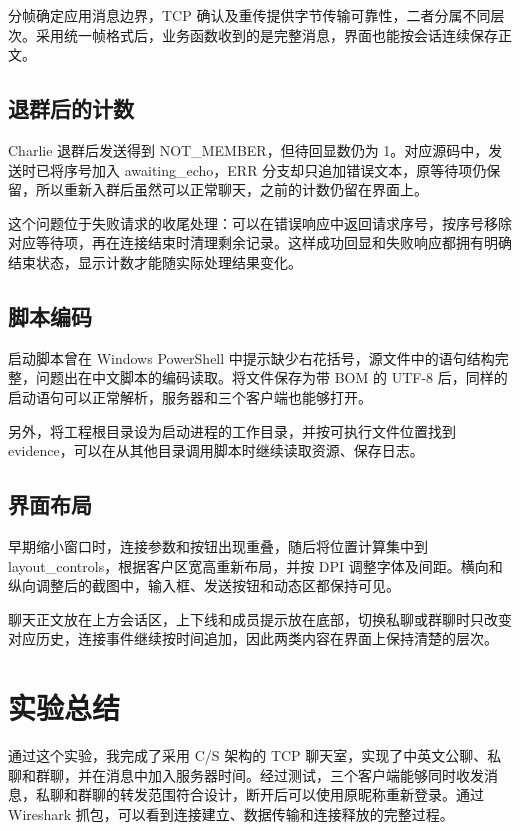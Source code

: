 \documentclass[UTF8,a4paper,10pt,fontset=fandol]{ctexart}
\begin{document}
分帧确定应用消息边界，TCP 确认及重传提供字节传输可靠性，二者分属不同层次。采用统一帧格式后，业务函数收到的是完整消息，界面也能按会话连续保存正文。

\subsection{退群后的计数}
Charlie 退群后发送得到 NOT\_MEMBER，但待回显数仍为 1。对应源码中，发送时已将序号加入 awaiting\_echo，ERR 分支却只追加错误文本，原等待项仍保留，所以重新入群后虽然可以正常聊天，之前的计数仍留在界面上。

这个问题位于失败请求的收尾处理：可以在错误响应中返回请求序号，按序号移除对应等待项，再在连接结束时清理剩余记录。这样成功回显和失败响应都拥有明确结束状态，显示计数才能随实际处理结果变化。

\medskip
\subsection{脚本编码}
启动脚本曾在 Windows PowerShell 中提示缺少右花括号，源文件中的语句结构完整，问题出在中文脚本的编码读取。将文件保存为带 BOM 的 UTF-8 后，同样的启动语句可以正常解析，服务器和三个客户端也能够打开。

另外，将工程根目录设为启动进程的工作目录，并按可执行文件位置找到 evidence，可以在从其他目录调用脚本时继续读取资源、保存日志。

\subsection{界面布局}
早期缩小窗口时，连接参数和按钮出现重叠，随后将位置计算集中到 layout\_controls，根据客户区宽高重新布局，并按 DPI 调整字体及间距。横向和纵向调整后的截图中，输入框、发送按钮和动态区都保持可见。

聊天正文放在上方会话区，上下线和成员提示放在底部，切换私聊或群聊时只改变对应历史，连接事件继续按时间追加，因此两类内容在界面上保持清楚的层次。

\section{实验总结}
通过这个实验，我完成了采用 C/S 架构的 TCP 聊天室，实现了中英文公聊、私聊和群聊，并在消息中加入服务器时间。经过测试，三个客户端能够同时收发消息，私聊和群聊的转发范围符合设计，断开后可以使用原昵称重新登录。通过 Wireshark 抓包，可以看到连接建立、数据传输和连接释放的完整过程。
\end{document}
